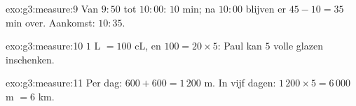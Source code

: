 \begin{solution}{exo:g3:measure:9}
Van $9{:}50$ tot $10{:}00$: $10$ min; na $10{:}00$ blijven er
$45 - 10 = 35$ min over. Aankomst: $10{:}35$.
\end{solution}

\begin{solution}{exo:g3:measure:10}
$1$ L $= 100$ cL, en $100 = 20 \times 5$: Paul kan $5$ volle glazen
inschenken.
\end{solution}

\begin{solution}{exo:g3:measure:11}
Per dag: $600 + 600 = 1\,200$ m. In vijf dagen:
$1\,200 \times 5 = 6\,000$ m $= 6$ km.
\end{solution}
